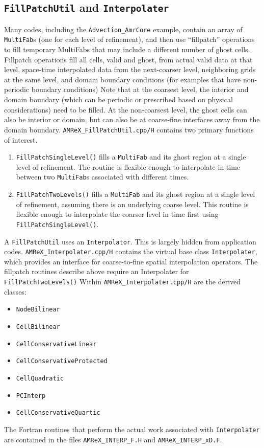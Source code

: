 \subsection{{\tt FillPatchUtil} and {\tt Interpolater}}\label{sec:amrcore:fillpatch}

Many codes, including the {\tt Advection\_AmrCore} example, contain an array of {\tt MultiFab}s
(one for each level of refinement), and then use ``fillpatch'' operations to fill temporary
MultiFabs that may include a different number of ghost cells.  Fillpatch operations fill
all cells, valid and ghost, from actual valid data at that level, space-time interpolated data 
from the next-coarser level, neighboring grids at the same level, and domain
boundary conditions (for examples that have non-periodic boundary conditions)
Note that at the coarsest level,
the interior and domain boundary (which can be periodic or prescribed based on physical considerations)
need to be filled.  At the non-coarsest level, the ghost cells can also be interior or domain,
but can also be at coarse-fine interfaces away from the domain boundary.
{\tt AMReX\_FillPatchUtil.cpp/H} contains two primary functions of interest.
\begin{enumerate}
\item {\tt FillPatchSingleLevel()} fills a {\tt MultiFab} and its ghost region at a single level of 
refinement.  The routine is flexible enough to interpolate in time between two {\tt MultiFab}s
associated with different times.
\item {\tt FillPatchTwoLevels()} fills a {\tt MultiFab} and its ghost region at a single level of 
refinement, assuming there is an underlying coarse level.  This routine is flexible enough to interpolate
the coarser level in time first using {\tt FillPatchSingleLevel()}.
\end{enumerate}

A {\tt FillPatchUtil} uses an {\tt Interpolator}.  This is largely hidden from application codes.
{\tt AMReX\_Interpolater.cpp/H} contains the virtual base class {\tt Interpolater}, which provides
an interface for coarse-to-fine spatial interpolation operators.  The fillpatch routines describe
above require an Interpolater for {\tt FillPatchTwoLevels()}
Within {\tt AMReX\_Interpolater.cpp/H} are the derived classes:
\begin{itemize}
\item {\tt NodeBilinear}
\item {\tt CellBilinear}
\item {\tt CellConservativeLinear}
\item {\tt CellConservativeProtected}
\item {\tt CellQuadratic}
\item {\tt PCInterp}
\item {\tt CellConservativeQuartic}
\end{itemize}
The Fortran routines that perform the actual work associated with {\tt Interpolater} are 
contained in the files {\tt AMReX\_INTERP\_F.H} and {\tt AMReX\_INTERP\_xD.F}.

